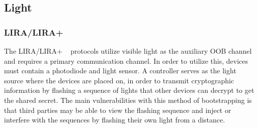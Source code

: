 \subsection{Light}
\subsubsection{LIRA/LIRA+}
The LIRA/LIRA+ ~\cite{kovavcevic2016flashing} protocols utilize visible light as the auxiliary OOB channel and requires a primary communication channel. In order to utilize this, devices must contain a photodiode and light sensor. A controller serves as the light source where the devices are placed on, in order to transmit cryptographic information by flashing a sequence of lights that other devices can decrypt to get the shared secret. The main vulnerabilities with this method of bootstrapping is that third parties may be able to view the flashing sequence and inject or interfere with the sequences by flashing their own light from a distance. 
